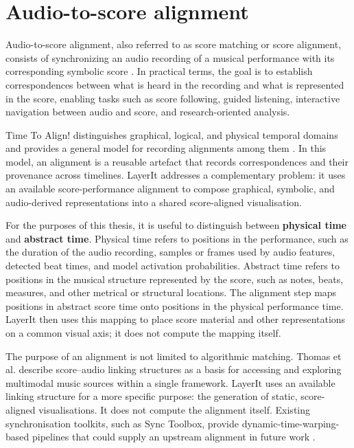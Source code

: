 \section{Audio-to-score alignment}
Audio-to-score alignment, also referred to as score matching or score alignment, consists of synchronizing an audio recording of a musical performance with its corresponding symbolic score \cite{carabias-ortiAUDIOSCOREALIGNMENTa}. In practical terms, the goal is to establish correspondences between what is heard in the recording and what is represented in the score, enabling tasks such as score following, guided listening, interactive navigation between audio and score, and research-oriented analysis.

Time To Align! distinguishes graphical, logical, and physical temporal domains and provides a general model for recording alignments among them \cite{hentschelTimeAlignModelling2026}. In this model, an alignment is a reusable artefact that records correspondences and their provenance across timelines. LayerIt addresses a complementary problem: it uses an available score-performance alignment to compose graphical, symbolic, and audio-derived representations into a shared score-aligned visualisation.

For the purposes of this thesis, it is useful to distinguish between \textbf{physical time} and \textbf{abstract time}. Physical time refers to positions in the performance, such as the duration of the audio recording, samples or frames used by audio features, detected beat times, and model activation probabilities. Abstract time refers to positions in the musical structure represented by the score, such as notes, beats, measures, and other metrical or structural locations. The alignment step maps positions in abstract score time onto positions in the physical performance time. LayerIt then uses this mapping to place score material and other representations on a common visual axis; it does not compute the mapping itself.

The purpose of an alignment is not limited to algorithmic matching. Thomas et al. \cite{thomasLinkingSheetMusic2012} describe score--audio linking structures as a basis for accessing and exploring multimodal music sources within a single framework. LayerIt uses an available linking structure for a more specific purpose: the generation of static, score-aligned visualisations. It does not compute the alignment itself. Existing synchronisation toolkits, such as Sync Toolbox, provide dynamic-time-warping-based pipelines that could supply an upstream alignment in future work \cite{mullerSyncToolbox2021}.

